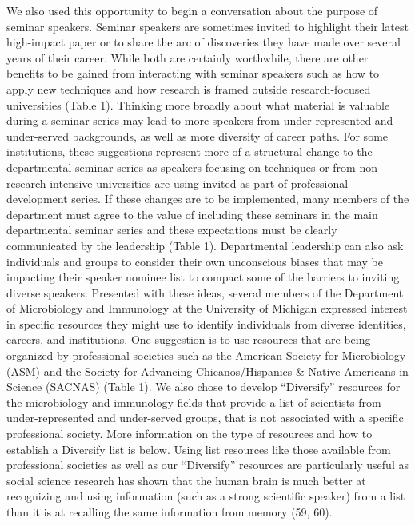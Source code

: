 \documentclass[10pt,]{article}
\begin{document}
We also used this opportunity to begin a conversation about the purpose
of seminar speakers. Seminar speakers are sometimes invited to highlight
their latest high-impact paper or to share the arc of discoveries they
have made over several years of their career. While both are certainly
worthwhile, there are other benefits to be gained from interacting with
seminar speakers such as how to apply new techniques and how research is
framed outside research-focused universities (Table 1). Thinking more
broadly about what material is valuable during a seminar series may lead
to more speakers from under-represented and under-served backgrounds, as
well as more diversity of career paths. For some institutions, these
suggestions represent more of a structural change to the departmental
seminar series as speakers focusing on techniques or from
non-research-intensive universities are using invited as part of
professional development series. If these changes are to be implemented,
many members of the department must agree to the value of including
these seminars in the main departmental seminar series and these
expectations must be clearly communicated by the leadership (Table 1).
Departmental leadership can also ask individuals and groups to consider
their own unconscious biases that may be impacting their speaker nominee
list to compact some of the barriers to inviting diverse speakers.
Presented with these ideas, several members of the Department of
Microbiology and Immunology at the University of Michigan expressed
interest in specific resources they might use to identify individuals
from diverse identities, careers, and institutions. One suggestion is to
use resources that are being organized by professional societies such as
the American Society for Microbiology (ASM) and the Society for
Advancing Chicanos/Hispanics \& Native Americans in Science (SACNAS)
(Table 1). We also chose to develop ``Diversify'' resources for the
microbiology and immunology fields that provide a list of scientists
from under-represented and under-served groups, that is not associated
with a specific professional society. More information on the type of
resources and how to establish a Diversify list is below. Using list
resources like those available from professional societies as well as
our ``Diversify'' resources are particularly useful as social science
research has shown that the human brain is much better at recognizing
and using information (such as a strong scientific speaker) from a list
than it is at recalling the same information from memory (59, 60).
\end{document}
